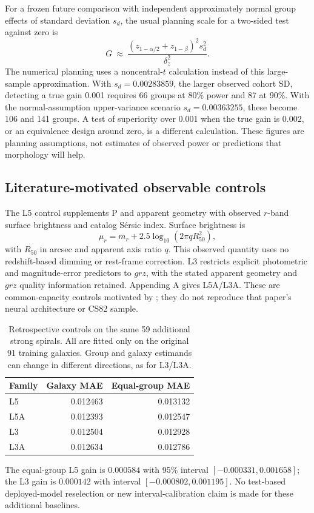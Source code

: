 \documentclass[10pt]{article}
\begin{document}
For a frozen future comparison with independent approximately normal group
effects of standard deviation $s_d$, the usual planning scale for a two-sided
test against zero is
\begin{equation}
 G\ \approx\ \frac{(z_{1-\alpha/2}+z_{1-\beta})^2s_d^2}{\delta_z^2}.
\end{equation}
The numerical planning uses a noncentral-$t$ calculation instead of this
large-sample approximation. With $s_d=0.00283859$, the larger observed cohort
SD, detecting a true gain 0.001 requires 66 groups at 80\% power and 87 at
90\%. With the normal-assumption upper-variance scenario
$s_d=0.00363255$, these become 106 and 141 groups. A test of superiority over
0.001 when the true gain is 0.002, or an equivalence design around zero, is
a different calculation. These figures are planning assumptions, not estimates
of observed power or predictions that morphology will help.

\subsection{Literature-motivated observable controls}
The L5 control supplements P and apparent geometry with observed $r$-band
surface brightness and catalog S\'ersic index. Surface brightness is
\begin{equation}
 \mu_r=m_r+2.5\log_{10}(2\pi q R_{50}^2),
\end{equation}
with $R_{50}$ in arcsec and apparent axis ratio $q$. This observed quantity
uses no redshift-based dimming or rest-frame correction. L3 restricts explicit
photometric and magnitude-error predictors to $grz$, with the stated apparent
geometry and $grz$ quality information retained. Appending A gives L5A/L3A.
These are common-capacity controls motivated by \citet{soo2018}; they do not
reproduce that paper's neural architecture or CS82 sample.

\begin{table}[htb]
\centering\small
\caption{Retrospective controls on the same 59 additional strong spirals.
All are fitted only on the original 91 training galaxies. Group and galaxy
estimands can change in different directions, as for L3/L3A.}
\begin{tabular}{lrr}
\toprule
Family & Galaxy MAE & Equal-group MAE\\
\midrule
L5 & 0.012463 & 0.013132\\
L5A & 0.012393 & 0.012547\\
L3 & 0.012504 & 0.012928\\
L3A & 0.012634 & 0.012786\\
\bottomrule
\end{tabular}
\end{table}
The equal-group L5 gain is $0.000584$ with 95\% interval
$[-0.000331,0.001658]$; the L3 gain is $0.000142$ with interval
$[-0.000802,0.001195]$. No test-based deployed-model reselection or new
interval-calibration claim is made for these additional baselines.
\end{document}
